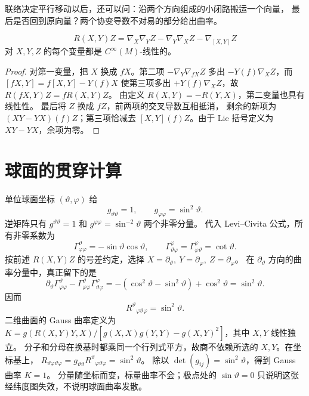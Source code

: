 

联络决定平行移动以后，还可以问：沿两个方向组成的小闭路搬运一个向量，
最后是否回到原向量？两个协变导数不对易的部分给出曲率。

\begin{proposition}[曲率的张量性]
\[
R(X,Y)Z=\nabla_X\nabla_YZ-\nabla_Y\nabla_XZ-\nabla_{[X,Y]}Z
\]
对 \(X,Y,Z\) 的每个变量都是 \(C^\infty(M)\)-线性的。
\end{proposition}
\begin{proof}
对第一变量，把 \(X\) 换成 \(fX\)。第二项
\(-\nabla_Y\nabla_{fX}Z\) 多出 \(-Y(f)\nabla_XZ\)，而
\([fX,Y]=f[X,Y]-Y(f)X\) 使第三项多出
\(+Y(f)\nabla_XZ\)，故 \(R(fX,Y)Z=fR(X,Y)Z\)。
由定义 \(R(X,Y)=-R(Y,X)\)，第二变量也具有线性性。
最后将 \(Z\) 换成 \(fZ\)，前两项的交叉导数互相抵消，
剩余的新项为 \((XY-YX)(f)Z\)；第三项恰减去
\([X,Y](f)Z\)。由于 Lie 括号定义为 \(XY-YX\)，余项为零。
\end{proof}



\section{球面的贯穿计算}

单位球面坐标 \((\vartheta,\varphi)\) 给
\[
g_{\vartheta\vartheta}=1,\qquad
g_{\varphi\varphi}=\sin^2\vartheta .
\]
逆矩阵只有 \(g^{\vartheta\vartheta}=1\) 和
\(g^{\varphi\varphi}=\sin^{-2}\vartheta\) 两个非零分量。
代入 Levi--Civita 公式，所有非零系数为
\[
\Gamma^\vartheta_{\varphi\varphi}
=-\sin\vartheta\cos\vartheta,\qquad
\Gamma^\varphi_{\vartheta\varphi}
=\Gamma^\varphi_{\varphi\vartheta}=\cot\vartheta.
\]
按前述 \(R(X,Y)Z\) 的号差约定，选择
\(X=\partial_\vartheta,\ Y=\partial_\varphi,\ Z=\partial_\varphi\)。
在 \(\partial_\vartheta\) 方向的曲率分量中，真正留下的是
\[
\partial_\vartheta\Gamma^\vartheta_{\varphi\varphi}
-\Gamma^\vartheta_{\varphi\varphi}
 \Gamma^\varphi_{\vartheta\varphi}
=-(\cos^2\vartheta-\sin^2\vartheta)+\cos^2\vartheta
=\sin^2\vartheta .
\]
因而
\[
R^\vartheta{}_{\varphi\vartheta\varphi}=\sin^2\vartheta.
\]
二维曲面的 Gauss 曲率定义为
\(K=g(R(X,Y)Y,X)/
[g(X,X)g(Y,Y)-g(X,Y)^2]\)，其中 \(X,Y\) 线性独立。
分子和分母在换基时都乘同一个行列式平方，故商不依赖所选的
\(X,Y\)。在坐标基上，
\(R_{\vartheta\varphi\vartheta\varphi}
=g_{\vartheta\vartheta}R^\vartheta{}_{\varphi\vartheta\varphi}
=\sin^2\vartheta\)。
除以 \(\det(g_{ij})=\sin^2\vartheta\)，得到 Gauss 曲率 \(K=1\)。
分量随坐标而变，标量曲率不会；极点处的 \(\sin\vartheta=0\)
只说明这张经纬度图失效，不说明球面曲率发散。

